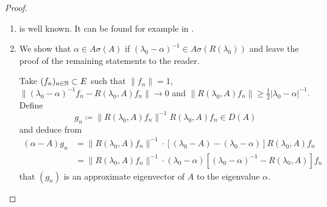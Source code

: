 \begin{proof}
\begin{enumerate}[\upshape (i), wide, labelsep=.5em]
\item 
is well known. It can be found for example in \citet[VII.9.2]{dunfordschwartz:1958}.

\item 
We show that $\alpha \in A\sigma(A)$ if $(\lambda_{0}-\alpha)^{-1} \in A\sigma(R(\lambda_{0}))$ and leave the proof of the remaining statements to the reader.

Take $(f_{n})_{n \in \mathbb{N}} \subset E$ such that $\|f_{n}\| = 1$, $\|(\lambda_{0}-\alpha)^{-1}f_{n} - R(\lambda_{0},A)f_{n}\| \to 0$ and $\|R(\lambda_{0},A)f_{n}\| \geq \frac{1}{2}|\lambda_{0} - \alpha|^{-1}$.
Define
\[
g_{n} \coloneqq \|R(\lambda_{0},A)f_{n}\|^{-1}R(\lambda_{0},A)f_{n} \in D(A)
\]
and deduce from
\begin{align*}
(\alpha-A)g_{n} &= \|R(\lambda_{0},A)f_{n}\|^{-1} \cdot 
		[(\lambda_{0}-A) - (\lambda_{0}-\alpha)]R(\lambda_{0},A)f_{n} \\  
	&= \|R(\lambda_{0},A)f_{n}\|^{-1} \cdot 			(\lambda_{0}-\alpha)[(\lambda_{0}-\alpha)^{-1} - R(\lambda_{0},A)]f_{n}
\end{align*}
that $(g_{n})$ is an approximate eigenvector of $A$ to the eigenvalue $\alpha$.


\end{enumerate}
\end{proof}
